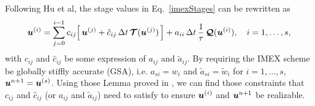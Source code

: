 Following Hu et al\cite{hu_etal_2018}, the stage values in Eq.~\eqref{imexStages} can be rewritten as
\begin{equation}
  \boldsymbol{u}^{(i)}
  =\sum_{j=0}^{i-1}c_{ij}\Big[\,\boldsymbol{u}^{(j)}+\hat{c}_{ij}\,\Delta t\,\boldsymbol{\mathcal{T}}(\boldsymbol{u}^{(j)})\,\Big]
  +a_{ii}\,\Delta t\,\frac{1}{\tau}\,\boldsymbol{\mathcal{Q}}(\boldsymbol{u}^{(i)}),\quad i=1,\ldots,s,
  \label{eq:imexStagesRewrite}
\end{equation}
with $c_{ij}$ and $\hat{c}_{ij}$ be some expression of $a_{ij}$ and $\tilde{a}_{ij}$.
By requiring the IMEX scheme be globally stiffly accurate (GSA), i.e. $a_{si}=w_{i}$ and $\tilde{a}_{si}=\tilde{w}_{i}$ for $i=1,\ldots,s$, $\boldsymbol{u}^{n+1} = \boldsymbol{u}^{(s)}$.
Using those Lemma proved in \cite{chu_etal_2018}, we can find those constraints that $c_{ij}$ and $\hat{c}_{ij}$ (or $a_{ij}$ and $\tilde{a}_{ij}$) need to satisfy to ensure $\boldsymbol{u}^{(i)}$ and $\boldsymbol{u}^{n+1}$ be realizable.



